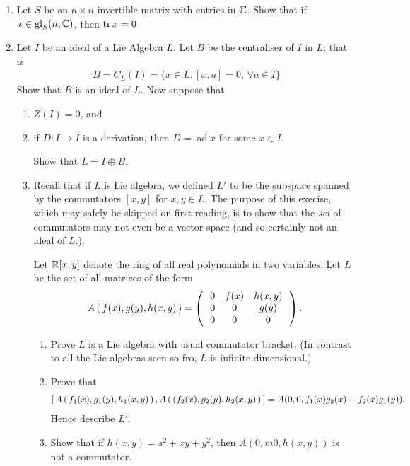 \documentclass[12pt,a4paper]{report}
\newcommand{\GL}{\operatorname{gl}}
\newcommand{\AD}{\operatorname{ad}}
\begin{document}
\begin{enumerate}[label=2.\arabic*]
\item Let $S$ be an $n \times n$ invertible matrix with entries in $\mathbb{C}$.  Show that if $x \in \GL_S(n,\C)$, then $\operatorname{tr} x=0$

\item Let $I$ be an ideal of a Lie Algebra $L$.  Let $B$ be the centraliser of $I$ in $L$; that is 
\begin{align*}
	B = C_L(I) = \{x \in L : [x,a]=0, \, \forall a \in I\}
\end{align*}Show that $B$ is an ideal of $L$.  Now suppose that
\begin{enumerate}
	\item $Z(I)=0$, and
	\item if $D:I\to I$ is a derivation, then $D=\AD x$ for some $x \in I$.
	
	Show that $L=I\oplus B$.
	
	\item Recall that if $L$ is  Lie algebra, we defined $L'$ to be the subspace spanned by the commutators $[x,y]$ for $x,y\in L$.  The purpose of this execise, which may safely be skipped on first reading, is to show that the \textit{set} of commutators may not even be a vector space (and so certainly not an ideal of $L$.).
	
	Let $\mathbb{R}[x,y]$ denote the ring of all real polynomials in two variables.  Let $L$ be the set of all matrices of the form 
	\begin{align*}
		A\left (\, f(x), g(y), h(x,y) \,\right ) = \left (\,  \begin{array}{c c c} 0&f(x)&h(x,y) \\ 0 & 0 & g(y) \\ 0 & 0 & 0 \end{array}  \,\right ).
	\end{align*}\begin{enumerate}[label=(\roman*)]
		\item Prove $L$ is a Lie algebra with usual commutator bracket. (In contrast to all the Lie algebras seen so fro, $L$ is infinite-dimensional.)
		\item Prove that
		\begin{align*}
			\left [\, A\left (\, f_1(x), g_1(y), h_1(x,y) \,\right ), A\left (\, (f_2(x), g_2(y), h_2(x,y) \,\right ) \,\right ] = A(0,0,f_1(x)g_2(x)-f_2(x)g_1(y)).
		\end{align*}Hence describe $L'$.
		
		\item Show that if $h(x,y)=s^2+xy+y^2$, then $A(0,m0,h(x,y))$ is not a commutator.
	
	\end{enumerate}
\end{enumerate}


\end{enumerate}
\end{document}
